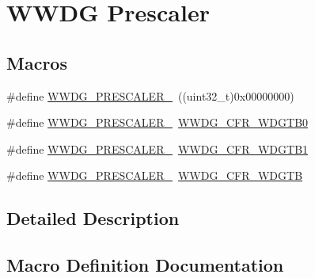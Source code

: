 \hypertarget{group___w_w_d_g___prescaler}{}\section{W\+W\+DG Prescaler}
\label{group___w_w_d_g___prescaler}
\subsection*{Macros}
\begin{DoxyCompactItemize}
\item 
\#define \hyperlink{group___w_w_d_g___prescaler_gac611617ca4116f9bfb55c5280abeb281}{W\+W\+D\+G\+\_\+\+P\+R\+E\+S\+C\+A\+L\+E\+R\+\_}~((uint32\+\_\+t)0x00000000)
\item 
\#define \hyperlink{group___w_w_d_g___prescaler_ga411e50531af74cfe88b5f58119e546fa}{W\+W\+D\+G\+\_\+\+P\+R\+E\+S\+C\+A\+L\+E\+R\+\_}~\hyperlink{group___peripheral___registers___bits___definition_ga4858525604534e493b8a09e0b04ace61}{W\+W\+D\+G\+\_\+\+C\+F\+R\+\_\+\+W\+D\+G\+T\+B0}
\item 
\#define \hyperlink{group___w_w_d_g___prescaler_ga38093104d0ad7e9ef5e036f6d0dc3ca8}{W\+W\+D\+G\+\_\+\+P\+R\+E\+S\+C\+A\+L\+E\+R\+\_}~\hyperlink{group___peripheral___registers___bits___definition_ga9d53e6fa74c43522ebacd6dd6f450d33}{W\+W\+D\+G\+\_\+\+C\+F\+R\+\_\+\+W\+D\+G\+T\+B1}
\item 
\#define \hyperlink{group___w_w_d_g___prescaler_ga766a9eff85955164df09186081f3cb40}{W\+W\+D\+G\+\_\+\+P\+R\+E\+S\+C\+A\+L\+E\+R\+\_}~\hyperlink{group___peripheral___registers___bits___definition_ga067b1d8238f1d5613481aba71a946638}{W\+W\+D\+G\+\_\+\+C\+F\+R\+\_\+\+W\+D\+G\+TB}
\end{DoxyCompactItemize}


\subsection{Detailed Description}


\subsection{Macro Definition Documentation}
